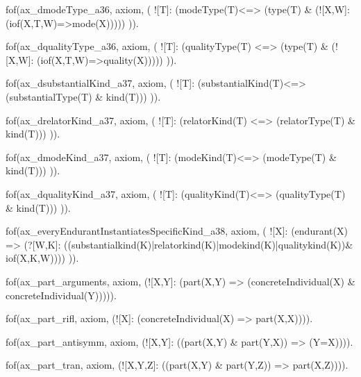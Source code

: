 
      fof(ax_dmodeType_a36, axiom, (
          ![T]: (modeType(T)<=> (type(T) & (![X,W]: (iof(X,T,W)=>mode(X)))))
      )).


      fof(ax_dqualityType_a36, axiom, (
          ![T]: (qualityType(T) <=> (type(T) & (![X,W]: (iof(X,T,W)=>quality(X)))))
      )).



      fof(ax_dsubstantialKind_a37, axiom, (
          ![T]: (substantialKind(T)<=> (substantialType(T) & kind(T)))
      )).

      fof(ax_drelatorKind_a37, axiom, (
          ![T]: (relatorKind(T) <=> (relatorType(T) & kind(T)))
      )).

      fof(ax_dmodeKind_a37, axiom, (
          ![T]: (modeKind(T)<=> (modeType(T) & kind(T)))
      )).

      fof(ax_dqualityKind_a37, axiom, (
          ![T]: (qualityKind(T)<=> (qualityType(T) & kind(T)))
      )).

      fof(ax_everyEndurantInstantiatesSpecificKind_a38, axiom, (
          ![X]: (endurant(X) => (?[W,K]: ((substantialkind(K)|relatorkind(K)|modekind(K)|qualitykind(K))& iof(X,K,W))))
      )).








fof(ax_part_arguments, axiom, (![X,Y]: (part(X,Y) => (concreteIndividual(X) & concreteIndividual(Y))))).

fof(ax_part_rifl, axiom, (![X]: (concreteIndividual(X) => part(X,X)))).

fof(ax_part_antisymm, axiom, (![X,Y]: ((part(X,Y) & part(Y,X)) => (Y=X)))).

fof(ax_part_tran, axiom, (![X,Y,Z]: ((part(X,Y) & part(Y,Z)) => part(X,Z)))).


